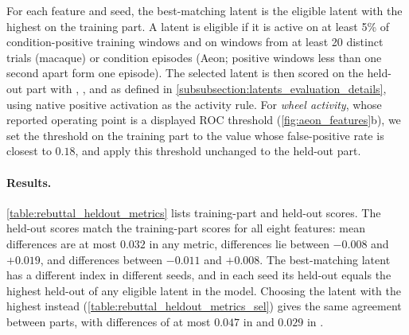 For each feature and seed, the best-matching latent is the eligible latent with the highest  on the training part. A latent is eligible if it is active on at least 5\% of condition-positive training windows and on windows from at least 20 distinct trials (macaque) or condition episodes (Aeon; positive windows less than one second apart form one episode). The selected latent is then scored on the held-out part with , ,  and  as defined in \hyperref[subsubsection:latents_evaluation_details]{\ref*{subsubsection:latents_evaluation_details}}, using native positive activation as the activity rule. For \textit{wheel activity}, whose reported operating point is a displayed ROC threshold (\autoref{fig:aeon_features}b), we set the threshold on the training part to the value whose false-positive rate is closest to $0.18$, and apply this threshold unchanged to the held-out part.

\paragraph{Results.}
\autoref{table:rebuttal_heldout_metrics} lists training-part and held-out scores. The held-out scores match the training-part scores for all eight features: mean differences are at most $0.032$ in any metric,  differences lie between $-0.008$ and $+0.019$, and  differences between $-0.011$ and $+0.008$. The best-matching latent has a different index in different seeds, and in each seed its held-out  equals the highest held-out  of any eligible latent in the model. Choosing the latent with the highest  instead (\autoref{table:rebuttal_heldout_metrics_sel}) gives the same agreement between parts, with differences of at most $0.047$ in  and $0.029$ in .

\begin{table}[!t]
    \centering
    {\small\setlength{\tabcolsep}{3pt}\renewcommand{\arraystretch}{1.12}
    }
    \caption{\textbf{Training-part and held-out scores of the best-matching latents.} Mean $\pm$ standard deviation over three seeds. Each model is trained on the training part only, and the latent for each feature is the eligible latent with the highest  on the training part (indices for seeds 0, 1, 2 in parentheses). Macaque rows: 80\% of trials for training, validation and test trials held out. Aeon rows: whole 15-minute blocks held out. ,  and  use native positive activation, except for \textit{wheel activity}, which uses a threshold fitted on the training part to a false-positive rate of $0.18$.}
    \label{table:rebuttal_heldout_metrics}
\end{table}

